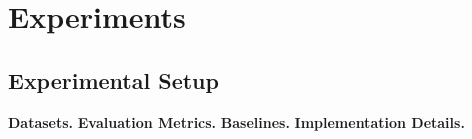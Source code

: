 \documentclass{article}
\begin{document}
%
%
%
%
%

\section{Experiments}
\label{sec:exp}


\subsection{Experimental Setup}
\label{sec:setup}

\textbf{Datasets.}
\textbf{Evaluation Metrics.}
\textbf{Baselines.}
\textbf{Implementation Details.}
\end{document}
